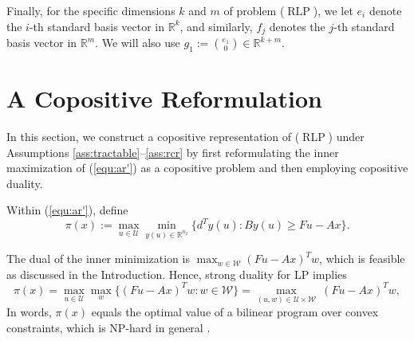\documentclass[12pt]{article}
\DeclareMathOperator{\AR}{RLP}
\newcommand{\U}{{\mathcal{U}}}
\newcommand{\W}{{\mathcal{W}}}
\newcommand{\p}{\pi}
\def\RR{{\mathbb{R}}}
\begin{document}
\begin{onehalfspace}
Finally, for the specific dimensions $k$ and $m$ of problem ($\AR$),
we let $e_i$ denote the $i$-th standard basis vector in $\RR^k$, and
similarly, $f_j$ denotes the $j$-th standard basis vector in $\RR^m$. We
will also use $g_1 := {e_1 \choose 0} \in \RR^{k+m}$.

\section{A Copositive Reformulation} \label{sec:copositive}

In this section, we construct a copositive representation of ($\AR$)
under Assumptions \ref{ass:tractable}--\ref{ass:rcr} by first
reformulating the inner maximization of (\ref{equ:ar'}) as a copositive
problem and then employing copositive duality.

Within (\ref{equ:ar'}), define 
\[
    \p(x) := \max_{u \in \U} \min_{y(u) \in \RR^{n_2}} \{ d^T y(u) : By(u) \ge Fu - Ax \}.
\]

\noindent The dual of the inner minimization is $\max_{w \in \W} (Fu -
Ax)^T w$, which is feasible as discussed in the Introduction. Hence,
strong duality for LP implies
%
\begin{equation} \label{equ:Q(x)}
    \p(x) = \max_{u \in \U} \max_w \{ (Fu - Ax)^T w : w \in \W \}
          = \max_{(u,w) \in \U \times \W} \ (Fu - Ax)^T w,
\end{equation}
%
In words, $\p(x)$ equals the optimal value of a bilinear program over
convex constraints, which is NP-hard in general \cite{Konno.1976}.


\end{onehalfspace}
\end{document}
